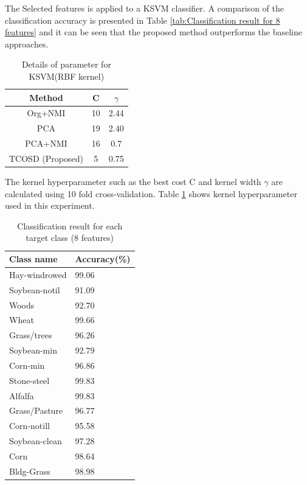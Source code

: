 \documentclass[document.tex]{subfiles}
\begin{document}
\noindent The Selected features is applied to a KSVM classifier. A comparison of the classification accuracy is presented in Table \ref{tab:Classification result for 8 features} and it can be seen that the proposed method outperforms the baseline approaches.
\begin{table}[H]
	\caption{Details of parameter for KSVM(RBF kernel)}
	\begin{center}
		\begin{tabular}{|c|c|c|}
			\hline
			Method & C & $\gamma$ \\ \hline
			Org+NMI & 10 & 2.44 \\ \hline
			PCA & 19 & 2.40 \\ \hline
			PCA+NMI & 16 & 0.7\\ \hline
			TCOSD (Proposed) & 5 & 0.75\\ \hline
		\end{tabular}
	\end{center}
	\label{tab:Details of parameter for KSVM(RBF kernel)}
\end{table}
\noindent The kernel hyperparameter such as the best cost C and kernel width $\gamma$ are calculated using 10 fold cross-validation\cite{29}. Table \ref{tab:Details of parameter for KSVM(RBF kernel)} shows kernel hyperparameter used in this experiment.

\begin{table}[H]
	\caption{Classification result for each target class (8 features)}
	\begin{center}
		\begin{tabular}{|l|l|}
			\hline
			Class name & Accuracy(\%)\\ \hline
			Hay-windrowed & 99.06\\ \hline
			Soybean-notil & 91.09\\ \hline
			Woods & 92.70\\ \hline
			Wheat & 99.66\\ \hline
			Grass/trees & 96.26\\ \hline
			Soybean-min & 92.79\\ \hline
			Corn-min & 96.86\\ \hline
			Stone-steel & 99.83\\ \hline
			Alfalfa & 99.83\\ \hline
			Grass/Pasture & 96.77\\ \hline
			Corn-notill & 95.58\\ \hline
			Soybean-clean & 97.28\\ \hline
			Corn & 98.64\\ \hline
			Bldg-Grass & 98.98\\ \hline
		\end{tabular}
	\end{center}
	\label{Classification result for each target class}
\end{table}
\end{document}
